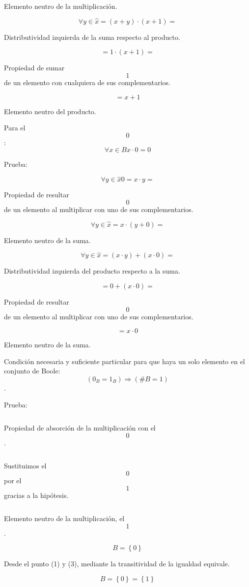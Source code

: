 Elemento neutro de la multiplicación.

\[\forall{y \in \widehat{x}}{{= {{({x + y})} \cdot {({x + 1})}}} =}\]

Distributividad izquierda de la suma respecto al producto.

\[{= {1 \cdot {({x + 1})}}} = {}\]

Propiedad de sumar \[1\]de un elemento con cualquiera de sus
complementarios.

\[= {x + 1}\]

Elemento neutro del producto.

Para el \[0\]: \[\forall{x \in B}{{x \cdot 0} = 0}\]

Prueba:

\[\forall{y \in \widehat{x}}{{0 = {x \cdot y}} =}\]

Propiedad de resultar \[0\] de un elemento al multiplicar con uno de sus
complementarios.

\[\forall{y \in \widehat{x}}{{= {x \cdot {({y + 0})}}} =}\]

Elemento neutro de la suma.

\[\forall{y \in \widehat{x}}{{= {{({x \cdot y})} + {({x \cdot 0})}}} =}\]

Distributividad izquierda del producto respecto a la suma.

\[{= {0 + {({x \cdot 0})}}} = {}\]

Propiedad de resultar \[0\] de un elemento al multiplicar con uno de sus
complementarios.

\[= {x \cdot 0}\]

Elemento neutro de la suma.

Condición necesaria y suficiente particular para que haya un solo
elemento en el conjunto de Boole:
\[\left( {0_{B} = 1_{B}} \right)\Rightarrow\left( {\text{\#}{B = 1}} \right)\].

Prueba:

\[\]

Propiedad de absorción de la multiplicación con el \[0\].

\[\]

Sustituimos el \[0\] por el \[1\] gracias a la hipótesis.

\[\]

Elemento neutro de la multiplicación, el \[1\].

\[B = \left\{ 0 \right\}\]

Desde el punto (1) y (3), mediante la transitividad de la igualdad
equivale.

\[{B = \left\{ 0 \right\}} = \left\{ 1 \right\}\]

